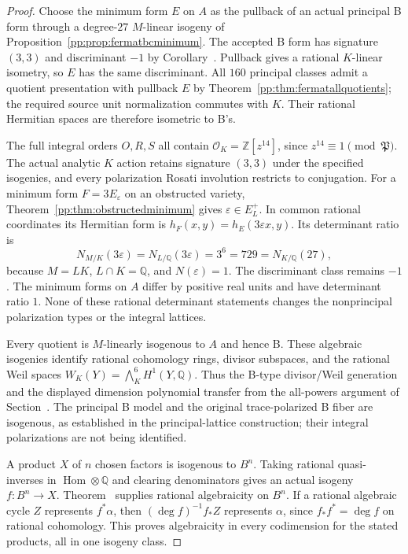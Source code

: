 \begin{proof}
Choose the minimum form $E$ on $A$ as the pullback of an actual
principal B form through a degree-$27$ $M$-linear isogeny of
Proposition~\ref{pp:prop:fermatbcminimum}. The accepted B form has
signature $(3,3)$ and discriminant $-1$ by
Corollary~. Pullback gives a rational $K$-linear
isometry, so $E$ has the same discriminant. All $160$ principal
classes admit a quotient presentation with pullback $E$ by
Theorem~\ref{pp:thm:fermatallquotients}; the required source unit
normalization commutes with $K$. Their rational Hermitian spaces
are therefore isometric to B's.

The full integral orders $O,R,S$ all contain
$\mathcal O_K=\mathbb Z[z^{14}]$, since $z^{14}\equiv1\pmod{\mathfrak P}$.
The actual analytic $K$ action retains signature $(3,3)$ under the
specified isogenies, and every polarization Rosati involution restricts
to conjugation. For a minimum form $F=3E_\varepsilon$ on an obstructed
variety, Theorem~\ref{pp:thm:obstructedminimum} gives
$\varepsilon\in E_L^+$. In common rational coordinates its Hermitian
form is $h_F(x,y)=h_E(3\varepsilon x,y)$. Its determinant ratio is
\[
 N_{M/K}(3\varepsilon)=N_{L/\mathbb Q}(3\varepsilon)
 =3^6=729=N_{K/\mathbb Q}(27),
\]
because $M=LK$, $L\cap K=\mathbb Q$, and $N(\varepsilon)=1$.
The discriminant class remains $-1$. The minimum forms on $A$ differ
by positive real units and have determinant ratio $1$. None of these
rational determinant statements changes the nonprincipal polarization
types or the integral lattices.

Every quotient is $M$-linearly isogenous to $A$ and hence B. These
algebraic isogenies identify rational cohomology rings, divisor subspaces,
and the rational Weil spaces
$W_K(Y)=\bigwedge_K^6H^1(Y,\mathbb Q)$. Thus the B-type
 divisor/Weil generation and the displayed dimension polynomial transfer
from the all-powers argument of Section~.
The principal B model and the original trace-polarized B fiber are
isogenous, as established in the principal-lattice construction; their
integral polarizations are not being identified.

A product $X$ of $n$ chosen factors is isogenous to $B^n$. Taking
rational quasi-inverses in $\operatorname{Hom}\otimes\mathbb Q$ and
clearing denominators gives an actual isogeny $f:B^n\to X$.
Theorem~ supplies rational algebraicity on
$B^n$. If a rational algebraic cycle $Z$ represents $f^*\alpha$,
then $(\deg f)^{-1}f_*Z$ represents $\alpha$, since
$f_*f^*=\deg f$ on rational cohomology. This proves algebraicity in
every codimension for the stated products, all in one isogeny class.
\end{proof}

